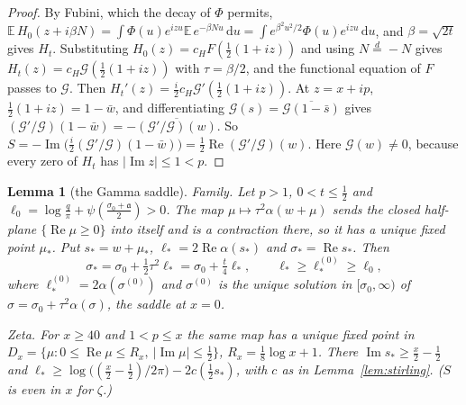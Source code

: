 \documentclass[11pt]{article}
\newtheorem{lemma}[theorem]{Lemma}
\theoremstyle{definition}
\theoremstyle{remark}
\newcommand{\E}{\mathbb E}
\newcommand{\dd}{\,\mathrm d}
\newcommand{\cG}{\mathcal G}
\newcommand{\fa}{\mathfrak a}
\newcommand{\re}{\operatorname{Re}}
\newcommand{\im}{\operatorname{Im}}
\numberwithin{equation}{section}
\begin{document}
\begin{proof}
By Fubini, which the decay of $\Phi$ permits,
$\E\,H_0(z+i\beta N)=\int\Phi(u)e^{izu}\E\,e^{-\beta Nu}\dd u=\int e^{\beta^2u^2/2}\Phi(u)e^{izu}\dd u$,
and $\beta=\sqrt{2t}$ gives $H_t$. Substituting $H_0(z)=c_HF(\frac12(1+iz))$
and using $N\stackrel d=-N$ gives $H_t(z)=c_H\cG(\frac12(1+iz))$ with
$\tau=\beta/2$, and the functional equation of $F$ passes to $\cG$. Then
$H_t'(z)=\frac i2c_H\cG'(\frac12(1+iz))$. At $z=x+ip$,
$\frac12(1+iz)=1-\bar w$, and differentiating
$\cG(s)=\overline{\cG(1-\bar s)}$ gives
$(\cG'/\cG)(1-\bar w)=-\overline{(\cG'/\cG)(w)}$. So
$S=-\im\bigl(\frac i2(\cG'/\cG)(1-\bar w)\bigr)=\frac12\re(\cG'/\cG)(w)$.
Here $\cG(w)\ne0$, because every zero of $H_t$ has $\lvert\im z\rvert\le1<p$.
\end{proof}

\begin{lemma}[the Gamma saddle]\label{lem:saddle}
\emph{Family.} Let $p>1$, $0<t\le\frac12$ and
$\ell_0=\log\frac q\pi+\psi(\frac{\sigma_0+\fa}2)>0$. The map
$\mu\mapsto\tau^2\alpha(w+\mu)$ sends the closed half-plane
$\{\re\mu\ge0\}$ into itself and is a contraction there, so it has a unique
fixed point $\mu_*$. Put $s_*=w+\mu_*$, $\ell_*=2\re\alpha(s_*)$ and
$\sigma_*=\re s_*$. Then
\[
\sigma_*=\sigma_0+\tfrac12\tau^2\ell_*=\sigma_0+\tfrac t4\ell_*,\qquad
\ell_*\ge\ell_*^{(0)}\ge\ell_0,
\]
where $\ell_*^{(0)}=2\alpha(\sigma^{(0)})$ and $\sigma^{(0)}$ is the unique
solution in $[\sigma_0,\infty)$ of $\sigma=\sigma_0+\tau^2\alpha(\sigma)$, the saddle at $x=0$.

\emph{Zeta.} For $x\ge40$ and $1<p\le x$ the same map has a unique fixed point
in $D_x=\{\mu:0\le\re\mu\le R_x,\ \lvert\im\mu\rvert\le\frac12\}$,
$R_x=\frac18\log x+1$. There $\im s_*\ge\frac x2-\frac12$ and
$\ell_*\ge\log\bigl((\frac x2-\frac12)/2\pi\bigr)-2c(\frac12s_*)$, with $c$
as in Lemma~\ref{lem:stirling}. ($S$ is even in $x$ for $\zeta$.)
\end{lemma}
\end{document}
